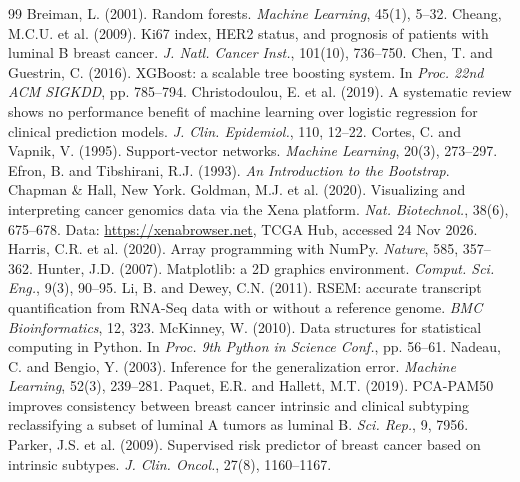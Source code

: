 \documentclass[10pt,twocolumn]{article}
\begin{document}

\begin{thebibliography}{99}
 Breiman, L. (2001). Random forests. \textit{Machine Learning}, 45(1), 5--32.
 Cheang, M.C.U. et al. (2009). Ki67 index, HER2 status, and prognosis of patients with luminal B breast cancer. \textit{J. Natl. Cancer Inst.}, 101(10), 736--750.
 Chen, T. and Guestrin, C. (2016). XGBoost: a scalable tree boosting system. In \textit{Proc. 22nd ACM SIGKDD}, pp. 785--794.
 Christodoulou, E. et al. (2019). A systematic review shows no performance benefit of machine learning over logistic regression for clinical prediction models. \textit{J. Clin. Epidemiol.}, 110, 12--22.
 Cortes, C. and Vapnik, V. (1995). Support-vector networks. \textit{Machine Learning}, 20(3), 273--297.
 Efron, B. and Tibshirani, R.J. (1993). \textit{An Introduction to the Bootstrap}. Chapman \& Hall, New York.
 Goldman, M.J. et al. (2020). Visualizing and interpreting cancer genomics data via the Xena platform. \textit{Nat. Biotechnol.}, 38(6), 675--678. Data: \url{https://xenabrowser.net}, TCGA Hub, accessed 24 Nov 2026.
 Harris, C.R. et al. (2020). Array programming with NumPy. \textit{Nature}, 585, 357--362.
 Hunter, J.D. (2007). Matplotlib: a 2D graphics environment. \textit{Comput. Sci. Eng.}, 9(3), 90--95.
 Li, B. and Dewey, C.N. (2011). RSEM: accurate transcript quantification from RNA-Seq data with or without a reference genome. \textit{BMC Bioinformatics}, 12, 323.
 McKinney, W. (2010). Data structures for statistical computing in Python. In \textit{Proc. 9th Python in Science Conf.}, pp. 56--61.
 Nadeau, C. and Bengio, Y. (2003). Inference for the generalization error. \textit{Machine Learning}, 52(3), 239--281.
 Paquet, E.R. and Hallett, M.T. (2019). PCA-PAM50 improves consistency between breast cancer intrinsic and clinical subtyping reclassifying a subset of luminal A tumors as luminal B. \textit{Sci. Rep.}, 9, 7956.
 Parker, J.S. et al. (2009). Supervised risk predictor of breast cancer based on intrinsic subtypes. \textit{J. Clin. Oncol.}, 27(8), 1160--1167.

\end{thebibliography}
\end{document}
